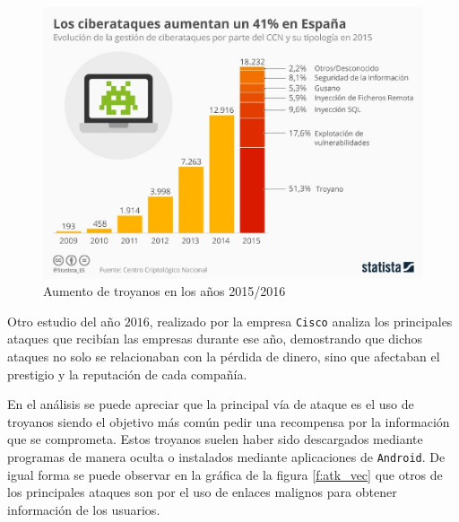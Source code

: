 \documentclass[12pt]{article}
\newcommand{\newpar} {
    \vskip 0.5cm
}
\begin{document}
            \begin{figure}
                \centering
                \includegraphics[width=\linewidth]{cyber_threats.png}
                \caption{Aumento de troyanos en los años 2015/2016}
                \label{f:cyber_threats}
            \end{figure}

            Otro estudio del año $2016$, realizado por la empresa \texttt{Cisco} analiza los principales ataques que recibían las empresas durante ese año, demostrando que dichos ataques no solo se relacionaban con la pérdida de dinero, sino que afectaban el prestigio y la reputación de cada compañía.

            \newpar

            En el análisis se puede apreciar que la principal vía de ataque es el uso de troyanos siendo el objetivo más común pedir una recompensa por la información que se comprometa. Estos troyanos suelen haber sido descargados mediante programas de manera oculta o instalados mediante aplicaciones de \texttt{Android}. De igual forma se puede observar en la gráfica de la figura \ref{f:atk_vec} que otros de los principales ataques son por el uso de enlaces malignos para obtener información de los usuarios.
\end{document}
